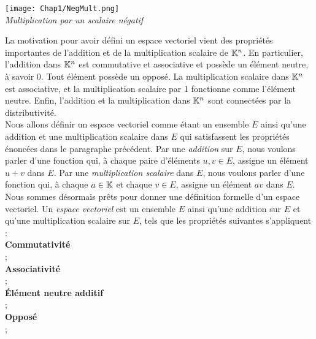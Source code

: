 \documentclass[12pt]{book}
\theoremstyle{plain}
\begin{document}
\begin{center}
    \texttt{[image: Chap1/NegMult.png]}\\
    \textit{Multiplication par un scalaire négatif}
\end{center}

La motivation pour avoir défini un espace vectoriel vient des propriétés importantes de l'addition et de la multiplication scalaire de $\mathbb{K}^n$. En particulier, l'addition dans $\mathbb{K}^n$ est commutative et associative et possède un élément neutre, à savoir 0. Tout élément possède un opposé. La multiplication scalaire dans $\mathbb{K}^n$ est associative, et la multiplication scalaire par 1 fonctionne comme l’élément neutre. Enfin, l'addition et la multiplication dans $\mathbb{K}^n$ sont connectées par la distributivité.\\
\indent
Nous allons définir un espace vectoriel comme étant un ensemble $E$ ainsi qu'une addition et une multiplication scalaire dans $E$ qui satisfassent les propriétés énoncées dans le paragraphe précédent. Par une \textit{addition} sur $E$, nous voulons parler d'une fonction qui, à chaque paire d'éléments $u,v\in E$, assigne un élément $u+v$ dans $E$. Par une \textit{multiplication scalaire} dans $E$, nous voulons parler d'une fonction qui, à chaque $a\in\mathbb{K}$ et chaque $v\in E$, assigne un élément $av$ dans $E$.\\
\indent
Nous sommes désormais prêts pour donner une définition formelle d'un espace vectoriel. Un \textit{espace vectoriel} est un ensemble $E$ ainsi qu'une addition sur $E$ et qu'une multiplication scalaire sur $E$, tels que les propriétés suivantes s'appliquent :\\

\noindent
\textbf{Commutativité}\\
 ;\\

\noindent
\textbf{Associativité}\\
 ;\\

\noindent
\textbf{Élément neutre additif}\\
 ;\\

\noindent
\textbf{Opposé}\\
 ;\\
\end{document}
